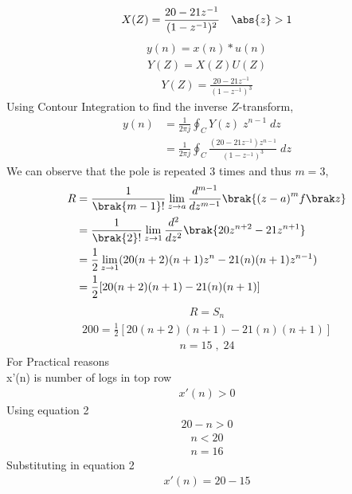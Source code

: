 \documentclass[journal,12pt,twocolumn]{IEEEtran}
\theoremstyle{remark}
\begin{document}
\begin{align} X(Z)=\frac{20-21z^{-1}}{(1 - z^{-1})^2}  \quad \abs{ z} > 1\end{align}
\begin{align}y(n) = x(n)*u(n)\end{align}
\begin{align}Y(Z) = X(Z)U(Z)\end{align}
\begin{align}Y(Z) = \frac{20-21z^{-1}}{(1 - z^{-1})^3}\end{align}
 Using Contour Integration to find the inverse $Z$-transform,
\begin{align}
    y(n)&=\frac{1}{2\pi j}\oint_{C}Y(z) \;z^{n-1} \;dz  \\
    &=\frac{1}{2\pi j}\oint_{C} \frac{(20-21z^{-1}) z^{n-1}}{(1 - z^{-1})^3} \;dz 
\end{align}
We can observe that the pole is repeated $3$ times and thus $m=3$,
\begin{align}
    R&=\frac{1}{\brak {m-1}!}\lim\limits_{z\to a}\frac{d^{m-1}}{dz^{m-1}}\brak {{(z-a)}^{m}f\brak z}  \\
    &=\frac{1}{\brak {2}!}\lim\limits_{z\to 1}\frac{d^{2}}{dz^{2}}\brak {20 z^{n+2}-21 z^{n+1}}   \\
    &=\frac{1}{2}\lim\limits_{z\to 1}(20(n+2)(n+1)z^{n}-21(n)(n+1)z^{n-1})   \\
    &=\frac{1}{2}[20(n+2)(n+1)-21(n)(n+1)]\end{align}
    \begin{align}
  R=S_n
\end{align}
 \begin{align}
  200=\frac{1}{2}[20(n+2)(n+1)-21(n)(n+1)]
\end{align}
\begin{align}n=15\; ,\;24\end{align}
For Practical reasons \\
x'(n) is number of logs in top row
\begin{align}x'(n)>0\end{align}
Using equation 2
\begin{align}20-n>0\end{align}
\begin{align}n<20\end{align}
\begin{align}n=16\end{align}
Substituting in equation 2
\begin{align}x'(n)=20-15\end{align}
\end{document}
